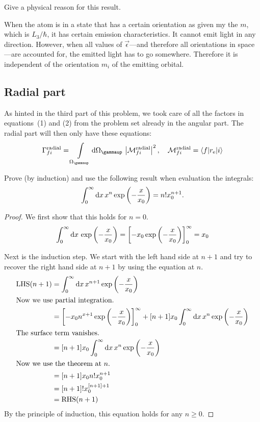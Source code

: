 \documentclass[11pt, english, fleqn, DIV=15, headinclude, BCOR=1.5cm]{scrartcl}
\newcommand\ra{^\text{radial}}
\begin{document}
\begin{problem}
    Give a physical reason for this result.
\end{problem}

When the atom is in a state that has a certain orientation as given my the $m$,
which is $L_3 / \hbar$, it has certain emission characteristics. It cannot emit
light in any direction. However, when all values of $\vec \epsilon$---and
therefore all orientations in space---are accounted for, the emitted light has
to go somewhere. Therefore it is independent of the orientation $m_i$ of the
emitting orbital.

\subsection{Radial part}

As hinted in the third part of this problem, we took care of all the factors in
equations~(1) and (2) from the problem set already in the angular part. The
radial part will then only have these equations:
\[
    \Gamma_{fi}\ra = \intop_{\Omega_\gammaup} \dif \Omega_\gammaup \,
    \abs{\mathcal M_{fi}\ra}^2
    \eqnsep
    \mathcal M_{fi}\ra = \braket{f|r_\text e|i}
\]

\begin{problem}
    Prove (by induction) and use the following result when evaluation the
    integrals:
    \[
        \int_0^\infty \mathop{}\!\mathrm d x \, x^n \exp\left( - \frac{x}{x_0} \right) = n! x_0^{n+1}.
    \]
\end{problem}

\begin{proof}
    We first show that this holds for $n = 0$.
    \[
        \int_0^\infty \mathop{}\!\mathrm d x \, \exp\left( - \frac{x}{x_0} \right)
        = \left[ -x_0 \exp\left( - \frac{x}{x_0} \right) \right]_0^\infty
        = x_0
    \]

    Next is the induction step. We start with the left hand side at $n + 1$ and
    try to recover the right hand side at $n+1$ by using the equation at $n$.
    \begin{align*}
        \operatorname{LHS}(n+1)
        &= \int_0^\infty \dif x \, x^{n+1} \exp\del{- \frac{x}{x_0}} \\
        \intertext{%
            Now we use partial integration.
        }
        &= \sbr{- x_0 n^{x+1} \exp\del{- \frac{x}{x_0}}}_0^\infty + [n+1] x_0
        \int_0^\infty \dif x \, x^{n} \exp\del{- \frac{x}{x_0}} \\
        \intertext{%
            The surface term vanishes.
        }
        &= [n+1] x_0 \int_0^\infty \dif x \, x^{n} \exp\del{- \frac{x}{x_0}} \\
        \intertext{%
            Now we use the theorem at $n$.
        }
        &= [n+1] x_0 n! x_0^{n+1} \\
        &= [n+1]! x_0^{[n+1]+1} \\
        &= \operatorname{RHS}(n+1)
    \end{align*}
    By the principle of induction, this equation holds for any $n \geq 0$.
\end{proof}
\end{document}
